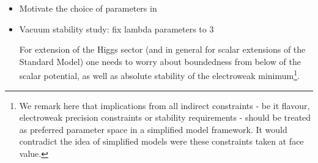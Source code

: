 \begin{itemize}
    \item Motivate the choice of parameters in~\cite{Bauer:2017ota}
    
    
    \item Vacuum stability study: fix lambda parameters to 3
    
    For extension of the Higgs sector (and in general for scalar extensions of the Standard Model) one needs to worry about 
    boundedness from below of the scalar potential, as well as absolute stability of the electroweak minimum\footnote{We remark 
    here that implications from all indirect constraints - be it flavour, electroweak precision constraints or stability 
    requirements -  should be treated as preferred parameter space in a simplified model framework. It would contradict the idea of simplified
models were these constraints taken at face value.}.  


\end{itemize}
